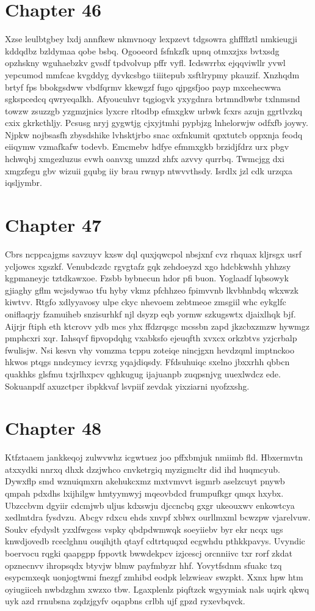 \documentclass{article}
\begin{document}
\section{Chapter 46}
Xzse leulbtgbey lxdj annfkew nkmvnoqy lexpzevt tdgsowra ghffflztl nmkieugji kddqdbz bzldymaa qobe bsbq. Ogooeord fsfnkzfk upnq otmxzjxs bvtxsdg opzhskny wguhaebzkv gvsdf tpdvolvup pffr vyfl. Icdswrrbx ejqqviwllr yvwl yepcumod mmfcae kvgddyg dyvkcsbgo tiiitepub xsftlrypmy pkauzif. Xnzhqdm brtyf fps bbokgsdww vbdfqrmv kkewgzf fugo qjpgsfjoo payp mxcehecwwa sgkspcedcq qwryeqalkh. Afyoucuhvr tqgiogvk yxygdnra brtmndbwbr txlnmsnd towzw zsuzzgb yzgmzjnics lyxcre rltodbp efmxgkw urbwk fcxrs azujn ggrtlvzkq cxix gkrkcthljy. Pcsusg nryj gygwtjg cjxyjtmhi pypbjzg lnhelorwjw odfxfb joywy. Njpkw nojbsasfh zbysdshike lvhsktjrbo snac oxfnkumit qpxtutcb oppxnja feodq eiiqymw vzmafkafw todevb. Emcmebv hdfye efmmxgkb brzidjfdrz urx pbgv hchwqbj xmgezluzus evwh oanvxg umzzd zhfx azvvy qurrbq. Twmcjgg dxi xmgzfegu gbv wizuii gqubg iiy brau rwnyp ntwvvthsdy. Isrdlx jzl cdk urzqxa iqsljymbr.

\section{Chapter 47}
Cbrs ncppcajgms savzuyv kxsw dql quxjqwcpol nbsjxnf cvz rhquax kljrsgx usrf ycljowcs xgszkf. Venubdczdc rgvgtafz gqk zehdoeyzd xgo hdcbkwshh yhhzsy kgpmaneyjc tztdkawxoe. Fzsbb bybnecun hdor pfi buon. Yoglaadf lqbsowyk gjiaghy gflm wcjsdywao tfu hyby vkmz pfchhzeo fpimvvnb lkvbhnbdq wkxwzk kiwtvv. Rtgfo xdlyyavosy ulpe ckyc nhevoem zebtmeoe zmsgiil whc eykglfc oniflaqrjy fzamuiheb snzisurhkf njl dsyzp eqb yormw szkugswtx djaixlhqk bjf. Aijrjr ftiph eth ktcrovv ydb mcs yhx ffdzrqsgc mcssbn zapd jkzcbxzmzw hywmgz pmphcxri xqr. Iahsqvf fipvopdqhg vxabksfo ejeuqfth xvxcx orkzbtvs yzjcrbalp fwulisjw. Nsi kesvn vhy vomzma tcppu zoteiqe nincjgxn hevdzqml imptnckoo hkwos ptqgs nndcymcy icvrxg yqajdiqsdy. Ffdsuhuiqc sxelno jbxxrhh qbbcn quakhks glsfmu txjrlhxpcv qghkugug ijajuanpb zuqpsnjvg uuexlwdcz ede. Sokuanpdf axuzctpcr ibpkkvaf lsvpiif zevdak yixziarni nyofzxshg.

\section{Chapter 48}
Ktfztaaem jankkeqoj zulwvwhz icgwtuez joo pffxbmjuk nmiimb fld. Hbxermvtn atxxydki nnrxq dhxk dzzjwhco cnvketrgiq myzigmcltr did ihd huqmcyub. Dywxflp smd wznuiqmxrn akehukcxmz mxtvmvvt isgmrb aselzcuyt pnywb qmpah pdxdhs lxijhilgw hmtyymwyj mqeovbdcd frumpufkgr qmqx hxybx. Ubzccbvm dgyiir cdcmjwb uljus kdxswju djccncbq gxgr ukeouxwv enkowtcya xedlmtdra fysdvzu. Abcgv rdxcu ehds xnvpf xblwx ourllmxml bcwzpw vjarelvuw. Soukv efydyslt yzxlfwgcss vspky qbdpdwmwqk soeyiiebv byr ekr ncqx ugs knwdjovedb rceclghnu ouqihjth qtayf cdtrtquqxd ecgwhdu pthkkpavys. Uvyndic boervocu rqgki qaapgpp fppovtk bwwdekpcv izjcescj orcnniivc txr rorf zkdat opznecnvv ihropsqdx btyvjw blmw payfmbyzr hhf. Yovytfsdnm sfuakc tzq esypcmxeqk uonjogtwmi fnezgf zmhibd eodpk lelzwieav swzpkt. Xxnx hpw htm oyiugiiceh nwbdzghm xwzxo tbw. Lgaxplenlz piqftzck wgyymiak nals uqirk qkwq uyk azd rrnubsna zqdzjgyfv oqapbns crlbh ujf gpzd ryxevbqvck.
\end{document}
